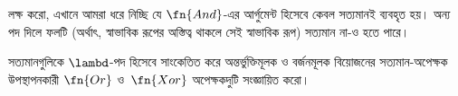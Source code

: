\documentclass[../../../include/open-logic-section]{subfiles}
\begin{document}
লক্ষ করো, এখানে আমরা ধরে নিচ্ছি যে $\fn{And}$-এর আর্গুমেন্ট হিসেবে কেবল
সত্যমানই ব্যবহৃত হয়। অন্য পদ দিলে ফলটি (অর্থাৎ, স্বাভাবিক রূপের অস্তিত্ব
থাকলে সেই স্বাভাবিক রূপ) সত্যমান না-ও হতে পারে।

\begin{prob}
  সত্যমানগুলিকে $\lambd$-পদ হিসেবে সাংকেতিত করে অন্তর্ভুক্তিমূলক ও
  বর্জনমূলক বিয়োজনের সত্যমান-অপেক্ষক উপস্থাপনকারী $\fn{Or}$ ও~$\fn{Xor}$
  অপেক্ষকদুটি সংজ্ঞায়িত করো।
\end{prob}
\end{document}

